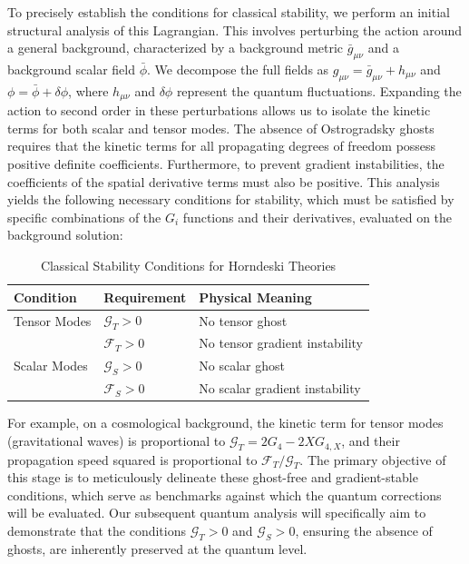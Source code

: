 \documentclass[twocolumn]{aastex631}
\begin{document}
To precisely establish the conditions for classical stability, we perform an initial structural analysis of this Lagrangian. This involves perturbing the action around a general background, characterized by a background metric $\bar{g}_{\mu\nu}$ and a background scalar field $\bar{\phi}$. We decompose the full fields as $g_{\mu\nu} = \bar{g}_{\mu\nu} + h_{\mu\nu}$ and $\phi = \bar{\phi} + \delta\phi$, where $h_{\mu\nu}$ and $\delta\phi$ represent the quantum fluctuations. Expanding the action to second order in these perturbations allows us to isolate the kinetic terms for both scalar and tensor modes. The absence of Ostrogradsky ghosts requires that the kinetic terms for all propagating degrees of freedom possess positive definite coefficients. Furthermore, to prevent gradient instabilities, the coefficients of the spatial derivative terms must also be positive. This analysis yields the following necessary conditions for stability, which must be satisfied by specific combinations of the $G_i$ functions and their derivatives, evaluated on the background solution:

\begin{table}[h!]
\centering
\caption{Classical Stability Conditions for Horndeski Theories}
\begin{tabular}{l l l}
\hline
\textbf{Condition} & \textbf{Requirement} & \textbf{Physical Meaning} \\
\hline
Tensor Modes & $\mathcal{G}_T > 0$ & No tensor ghost \\
& $\mathcal{F}_T > 0$ & No tensor gradient instability \\
Scalar Modes & $\mathcal{G}_S > 0$ & No scalar ghost \\
& $\mathcal{F}_S > 0$ & No scalar gradient instability \\
\hline
\end{tabular}
\end{table}

For example, on a cosmological background, the kinetic term for tensor modes (gravitational waves) is proportional to $\mathcal{G}_T = 2G_4 - 2X G_{4,X}$, and their propagation speed squared is proportional to $\mathcal{F}_T / \mathcal{G}_T$. The primary objective of this stage is to meticulously delineate these ghost-free and gradient-stable conditions, which serve as benchmarks against which the quantum corrections will be evaluated. Our subsequent quantum analysis will specifically aim to demonstrate that the conditions $\mathcal{G}_T > 0$ and $\mathcal{G}_S > 0$, ensuring the absence of ghosts, are inherently preserved at the quantum level.
\end{document}

